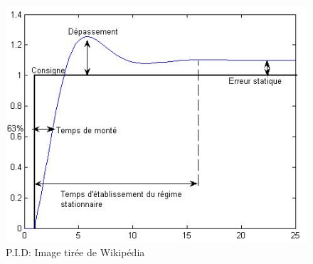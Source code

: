 \documentclass[12pt]{report}
\begin{document}
\begin{figure}
\begin{center}
\includegraphics[scale = 0.85]{Reponse_echelon_PID.png}
\caption{\label{graphe3} P.I.D: Image tir\'{e}e de Wikip\'{e}dia}
\end{center}
\end{figure}
\end{document}
